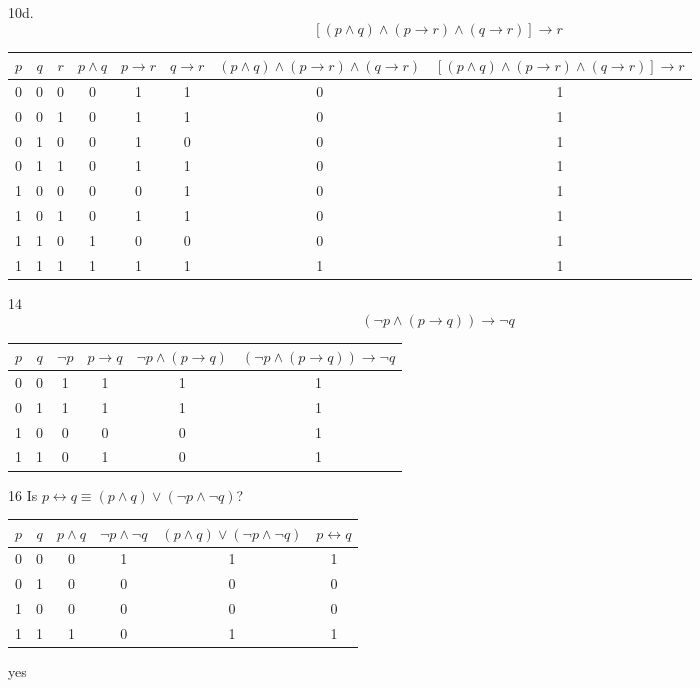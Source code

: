 \documentclass{article}
\begin{document}
10d.
$$[(p \land q) \land (p \rightarrow r) \land (q \rightarrow r)] \rightarrow r$$

\begin{tabular}{c|c|c|c|c|c|c|c}
$p$ &
$q$ &
$r$ &
$p \land q$ &
$p \rightarrow r$ &
$q \rightarrow r$ &
$(p \land q) \land (p \rightarrow r) \land (q \rightarrow r)$ &
$[(p \land q) \land (p \rightarrow r) \land (q \rightarrow r)] \rightarrow r$ \\
\hline
0 & 0 & 0 & 0 & 1 & 1 & 0 & 1\\
0 & 0 & 1 & 0 & 1 & 1 & 0 & 1\\
0 & 1 & 0 & 0 & 1 & 0 & 0 & 1\\
0 & 1 & 1 & 0 & 1 & 1 & 0 & 1\\
1 & 0 & 0 & 0 & 0 & 1 & 0 & 1\\
1 & 0 & 1 & 0 & 1 & 1 & 0 & 1\\
1 & 1 & 0 & 1 & 0 & 0 & 0 & 1\\
1 & 1 & 1 & 1 & 1 & 1 & 1 & 1\\
\end{tabular}

14
$$(\lnot p \land (p \rightarrow q)) \rightarrow \lnot q$$

\begin{tabular}{c|c|c|c|c|c}
$p$ &
$q$ &
$\lnot p$ &
$p \rightarrow q$ &
$\lnot p \land (p \rightarrow q)$ &
$(\lnot p \land (p \rightarrow q)) \rightarrow \lnot q$ \\
\hline
0 & 0 & 1 & 1 & 1 & 1 \\
0 & 1 & 1 & 1 & 1 & 1 \\
1 & 0 & 0 & 0 & 0 & 1 \\
1 & 1 & 0 & 1 & 0 & 1 \\
\end{tabular}

16
Is $p \leftrightarrow q \equiv (p \land q) \lor (\lnot p \land \lnot q)$?

\begin{tabular}{c|c|c|c|c|c}
$p$ &
$q$ &
$p \land q$ & 
$\lnot p \land \lnot q$ &
$(p \land q) \lor (\lnot p \land \lnot q)$ &
$p \leftrightarrow q$ \\
\hline
0 & 0 & 0 & 1 & 1 & 1 \\
0 & 1 & 0 & 0 & 0 & 0 \\
1 & 0 & 0 & 0 & 0 & 0 \\
1 & 1 & 1 & 0 & 1 & 1 \\
\end{tabular}

yes
\end{document}
